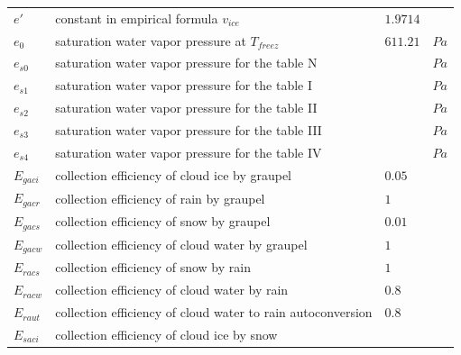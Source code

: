\documentclass[letterpaper,titlepage,10pt]{article}
\numberwithin{equation}{section}
\begin{document}
\begin{appendices}
\begin{longtable}{p{}p{}p{}p{}}
	$e'$               & constant in empirical formula $v_{ice}$                                              & $1.9714$                   & \\
	$e_0$              & saturation water vapor pressure at $T_{freez}$                                       & $611.21$                   & $Pa$ \\
	$e_{s0}$           & saturation water vapor pressure for the table N                                      &                            & $Pa$ \\
	$e_{s1}$           & saturation water vapor pressure for the table I                                      &                            & $Pa$ \\
	$e_{s2}$           & saturation water vapor pressure for the table II                                     &                            & $Pa$ \\
	$e_{s3}$           & saturation water vapor pressure for the table III                                    &                            & $Pa$ \\
	$e_{s4}$           & saturation water vapor pressure for the table IV                                     &                            & $Pa$ \\
	$E_{gaci}$         & collection efficiency of cloud ice by graupel                                        & $0.05$                     & \\
	$E_{gacr}$         & collection efficiency of rain by graupel                                             & $1$                        & \\
	$E_{gacs}$         & collection efficiency of snow by graupel                                             & $0.01$                     & \\
	$E_{gacw}$         & collection efficiency of cloud water by graupel                                      & $1$                        & \\
	$E_{racs}$         & collection efficiency of snow by rain                                                & $1$                        & \\
	$E_{racw}$         & collection efficiency of cloud water by rain                                         & $0.8$                      & \\
	$E_{raut}$         & collection efficiency of cloud water to rain autoconversion                          & $0.8$                      & \\
	$E_{saci}$         & collection efficiency of cloud ice by snow                                           &                            & \\

\end{longtable}
\end{appendices}
\end{document}
